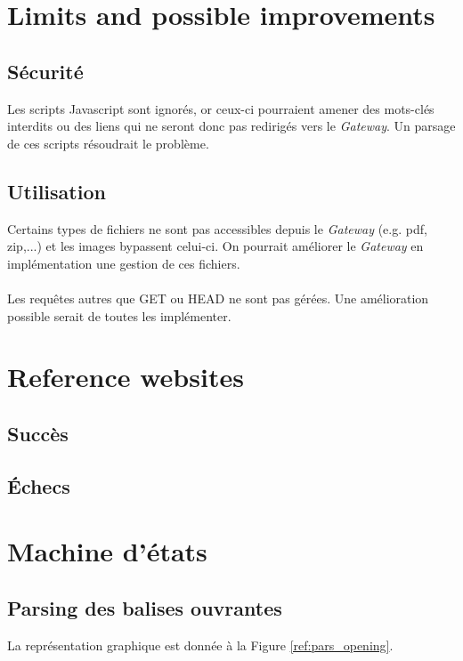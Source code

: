 \documentclass[a4paper,11pt]{article}
\begin{document}
\section{Limits and possible improvements}

	\subsection{Sécurité}
Les scripts Javascript sont ignorés, or ceux-ci pourraient amener des mots-clés interdits ou des liens qui ne seront donc pas redirigés vers le \textit{Gateway}. Un parsage de ces scripts résoudrait le problème. 

	\subsection{Utilisation}
Certains types de fichiers ne sont pas accessibles depuis le \textit{Gateway} (e.g. pdf, zip,...) et les images bypassent celui-ci. On pourrait améliorer le \textit{Gateway} en implémentation une gestion de ces fichiers.
\paragraph{}
Les requêtes autres que GET ou HEAD ne sont pas gérées. Une amélioration possible serait de toutes les implémenter.

\section{Reference websites}

	\subsection{Succès}

	\subsection{Échecs}






\newpage
\appendix
\section{Machine d'états}
\subsection{Parsing des balises ouvrantes}
La représentation graphique est donnée à la Figure \ref{ref:pars_opening}.
\end{document}
